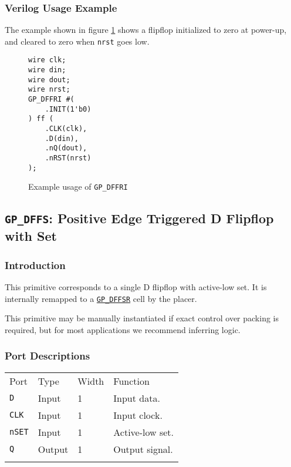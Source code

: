\documentclass[11pt]{article}
\newcommand{\tokenstyle}[1]{\texttt{#1}}
\newcommand{\wirestyle}[1]{\texttt{#1}}
\newcommand{\whenstyle}[1]{{\fontseries{sb}\selectfont#1}}
\newcommand{\tokenref}[2]{\hyperref[#2]{\tokenstyle{#1}}}
\newcommand{\thinhline}{\Xhline{1\arrayrulewidth}}
\newcommand{\thickhline}{\Xhline{2.5\arrayrulewidth}}
\begin{document}
\subsubsection{Verilog Usage Example}

The example shown in figure \ref{gp-dffri-example} shows a flipflop initialized to zero at power-up, and cleared to zero
when \wirestyle{nrst} goes low.

\begin{figure}[h]
\begin{lstlisting}
wire clk;
wire din;
wire dout;
wire nrst;
GP_DFFRI #(
	.INIT(1'b0)
) ff (
	.CLK(clk),
	.D(din),
	.nQ(dout),
	.nRST(nrst)
);
\end{lstlisting}
\caption{Example usage of \tokenstyle{GP\_DFFRI}}
\label{gp-dffri-example}
\end{figure}


\pagebreak
\subsection{\tokenstyle{GP\_DFFS}: Positive Edge Triggered D Flipflop with Set}
\label{gp-dffs}

\subsubsection{Introduction}
This primitive corresponds to a single D flipflop with active-low set. It is internally remapped to a
\tokenref{GP\_DFFSR}{gp-dffsr} cell by the placer.

This primitive may be manually instantiated if exact control over packing is required, but for most applications we
recommend inferring logic.

\subsubsection{Port Descriptions}

\begin{tabularx}{\textwidth}{lllX}
\thinhline
\whenstyle{Port} & \whenstyle{Type} & \whenstyle{Width} & \whenstyle{Function} \\
\thickhline
\tokenstyle{D} & Input & 1 & Input data. \\
\thinhline
\tokenstyle{CLK} & Input & 1 & Input clock. \\
\thinhline
\tokenstyle{nSET} & Input & 1 & Active-low set. \\
\thinhline
\tokenstyle{Q} & Output & 1 & Output signal. \\
\thinhline
\end{tabularx}
\end{document}
